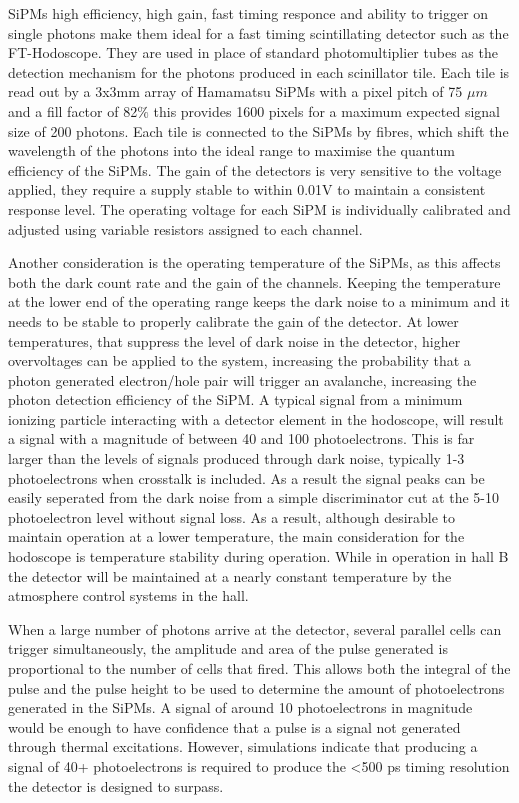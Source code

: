SiPMs high efficiency, high gain, fast timing responce and ability to trigger on single photons make them ideal for a fast timing scintillating detector such as the FT-Hodoscope. They are used in place of standard photomultiplier tubes as the detection mechanism for the photons produced in each scinillator tile. Each tile is read out by a 3x3mm array of Hamamatsu SiPMs with a pixel pitch of 75 $\mu m$ and a fill factor of 82$\%$ this provides 1600 pixels for a maximum expected signal size of 200 photons. Each tile is connected to the SiPMs by fibres, which shift the wavelength of the photons into the ideal range to maximise the quantum efficiency of the SiPMs. The gain of the detectors is very sensitive to the voltage applied, they require a supply stable to within 0.01V to maintain a consistent response level. The operating voltage for each SiPM is individually calibrated and adjusted using variable resistors assigned to each channel. 

Another consideration is the operating temperature of the SiPMs, as this affects both the dark count rate and the gain of the channels. Keeping the temperature at the lower end of the operating range keeps the dark noise to a minimum and it needs to be stable to properly calibrate the gain of the detector. At lower temperatures, that suppress the level of dark noise in the detector, higher overvoltages can be applied to the system, increasing the probability that a photon generated electron/hole pair will trigger an avalanche, increasing the photon detection efficiency of the SiPM. A typical signal from a minimum ionizing particle interacting with a detector element in the hodoscope, will result a signal with a magnitude of between 40 and 100 photoelectrons. This is far larger than the levels of signals produced through dark noise, typically 1-3 photoelectrons when crosstalk is included. As a result the signal peaks can be easily seperated from the dark noise from a simple discriminator cut at the 5-10 photoelectron level without signal loss. As a result, although desirable to maintain operation at a lower temperature, the main consideration for the hodoscope is temperature stability during operation. While in operation in hall B the detector will be maintained at a nearly constant temperature by the atmosphere control systems in the hall.

When a large number of photons arrive at the detector, several parallel cells can trigger simultaneously, the amplitude and area of the pulse generated is proportional to the number of cells that fired. This allows both the integral of the pulse and the pulse height to be used to determine the amount of photoelectrons generated in the SiPMs. A signal of around 10 photoelectrons in magnitude would be enough to have confidence that a pulse is a signal not generated through thermal excitations. However, simulations indicate that producing a signal of 40+ photoelectrons is required to produce the <500 ps timing resolution the detector is designed to surpass.





